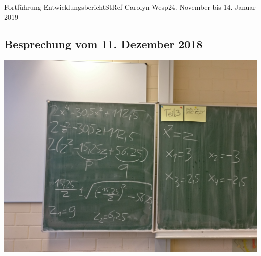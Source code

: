 \documentclass[oneside,openany,headings=optiontotoc,11pt,numbers=noenddot]{article}
\begin{document}
	
	
	
	\begin{worksheet}{Fortführung Entwicklungsbericht}{StRef\grq{} Carolyn Wesp}{24. November bis 14. Januar 2019}
		\subsection*{Besprechung vom 11. Dezember 2018}
		\includegraphics[width=\textwidth]{../Substitution_1.jpg}\\
		\par\noindent
		\begin{minipage}{0.48\textwidth}

\end{minipage}
\end{worksheet}
\end{document}
